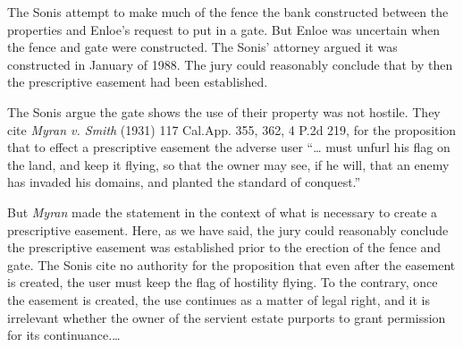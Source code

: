 The Sonis attempt to make much of the fence the bank constructed between the
properties and Enloe's request to put in a gate. But Enloe was uncertain when
the fence and gate were constructed. The Sonis' attorney argued it was
constructed in January of 1988. The jury could reasonably conclude that by then
the prescriptive easement had been established.

The Sonis argue the gate shows the use of their property was not hostile. They
cite \textit{Myran v. Smith} (1931) 117 Cal.App. 355, 362, 4 P.2d 219, for the
proposition that to effect a prescriptive easement the adverse user ``\ldots
must unfurl his flag on the land, and keep it flying, so that the owner may see,
if he will, that an enemy has invaded his domains, and planted the standard of
conquest.''

But \textit{Myran} made the statement in the context of what is necessary to
create a prescriptive easement. Here, as we have said, the jury could reasonably
conclude the prescriptive easement was established prior to the erection of the
fence and gate. The Sonis cite no authority for the proposition that even after
the easement is created, the user must keep the flag of hostility flying. To the
contrary, once the easement is created, the use continues as a matter of legal
right, and it is irrelevant whether the owner of the servient estate purports to
grant permission for its continuance.\dots

